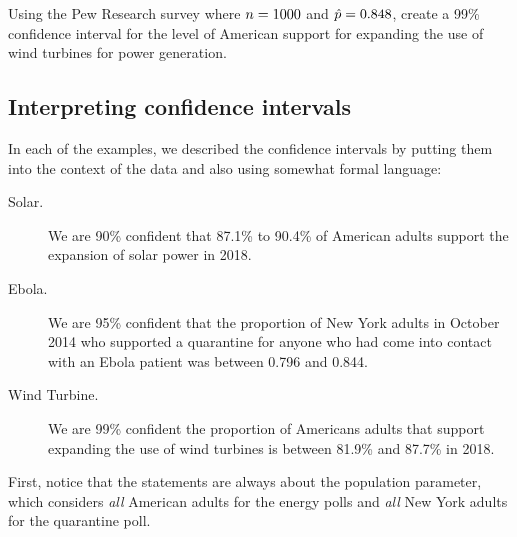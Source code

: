 \begin{exercisewrap}
\begin{nexercise}
Using the Pew Research survey where $n = 1000{}$ and
$\hat{p} = 0.848{}$, create a 99\% confidence interval
for the level of American support for expanding the use of wind
turbines for power
generation.\footnotemark
\end{nexercise}
\end{exercisewrap}


\subsection{Interpreting confidence intervals}
\label{interpretingCIs}


In each of the examples, we described the confidence
intervals by putting them into the context of the data and also
using somewhat formal language:
\begin{description}
  \item[Solar.] We are 90\% confident that 87.1\% to 90.4\% of
      American adults support the expansion of solar power in 2018.
  \item[Ebola.] We are 95\% confident that the proportion
      of New York adults in October 2014 who supported a quarantine
      for anyone who had come into contact with an Ebola patient was
      between 0.796 and 0.844.
  \item[Wind Turbine.] We are 99\% confident the proportion of
      Americans adults that support expanding the use of wind
      turbines is between 81.9\% and 87.7\% in 2018.
\end{description}
First, notice that the statements are always about the population
parameter, which considers \emph{all} American adults for the
energy polls and \emph{all} New York adults for the quarantine poll.

